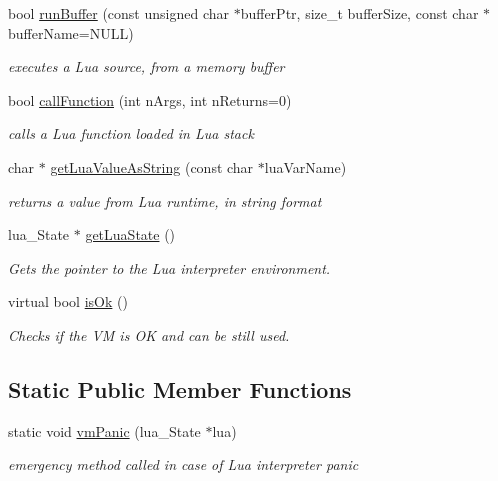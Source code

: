 \begin{CompactItemize}
bool \hyperlink{classEOSLuaEnvironment_2c229ac186b5df733a1b2177fd7218aa}{runBuffer} (const unsigned char $\ast$bufferPtr, size\_\-t bufferSize, const char $\ast$bufferName=NULL)
\begin{CompactList}\small\item\em executes a Lua source, from a memory buffer \item\end{CompactList}\item 
bool \hyperlink{classEOSLuaEnvironment_dad2df9fe00ab74fa40f61e65b64d041}{callFunction} (int nArgs, int nReturns=0)
\begin{CompactList}\small\item\em calls a Lua function loaded in Lua stack \item\end{CompactList}\item 
char $\ast$ \hyperlink{classEOSLuaEnvironment_f0ec64cece3cb022704af6aab5377bbf}{getLuaValueAsString} (const char $\ast$luaVarName)
\begin{CompactList}\small\item\em returns a value from Lua runtime, in string format \item\end{CompactList}\item 
lua\_\-State $\ast$ \hyperlink{classEOSLuaEnvironment_f0e9201ab81ce4be089f0f99197a06b1}{getLuaState} ()
\begin{CompactList}\small\item\em Gets the pointer to the Lua interpreter environment. \item\end{CompactList}\item 
virtual bool \hyperlink{classEOSLuaEnvironment_b56241a405c111658211cab0706fff71}{isOk} ()
\begin{CompactList}\small\item\em Checks if the VM is OK and can be still used. \item\end{CompactList}\end{CompactItemize}
\subsection*{Static Public Member Functions}
\begin{CompactItemize}
\item 
static void \hyperlink{classEOSLuaEnvironment_cfd50ba33863147fab881765110410c0}{vmPanic} (lua\_\-State $\ast$lua)
\begin{CompactList}\small\item\em emergency method called in case of Lua interpreter panic \item\end{CompactList}\end{CompactItemize}
